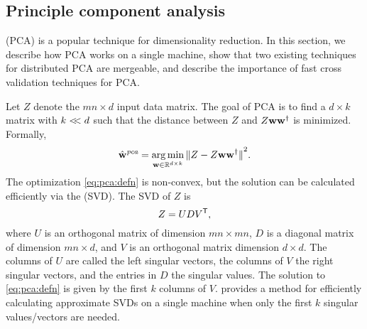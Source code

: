 \documentclass[thesis.tex]{subfiles}
\newcommand{\wpca}{\hat\w^\textit{pca}}
\begin{document}

\subsection{Principle component analysis}
\label{sec:merge:pca}

 (PCA) is a popular technique for dimensionality reduction.
In this section,
we describe how PCA works on a single machine,
show that two existing techniques for distributed PCA are mergeable,
and describe the importance of fast cross validation techniques for PCA.

Let $Z$ denote the $mn\times d$ input data matrix.
The goal of PCA is to find a $d\times k$ matrix with $k <\!\!< d$ such that the distance between $Z$ and $Z\mathbf w{\mathbf w}^{\mathsf{\dagger}}$ is minimized.
Formally, 
\begin{equation}
    \label{eq:pca:defn}
    \wpca = \argmin_{\w\in\R^{d\times k}} \ltwo{Z - Z\w\pinv\w}^2
    .
\end{equation}
The optimization \eqref{eq:pca:defn} is non-convex, 
but the solution can be calculated efficiently via the  (SVD). 
The SVD of $Z$ is
\begin{equation}
    Z = UD{V}^{\mathsf{T}}
    ,
\end{equation}
where $U$ is an orthogonal matrix of dimension $mn\times mn$, 
$D$ is a diagonal matrix of dimension $mn\times d$, 
and $V$ is an orthogonal matrix dimension $d\times d$.
The columns of $U$ are called the left singular vectors, 
the columns of $V$ the right singular vectors,
and the entries in $D$ the singular values.
The solution to \eqref{eq:pca:defn} is given by the first $k$ columns of $V$.
\citet{halko2011finding} provides a method for efficiently calculating approximate SVDs on a single machine when only the first $k$ singular values/vectors are needed.
\end{document}
